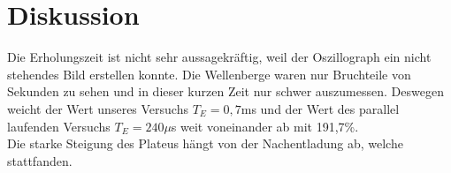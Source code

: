 \section{Diskussion}
\label{sec:Diskussion}
Die Erholungszeit ist nicht sehr aussagekräftig, weil der Oszillograph ein nicht stehendes Bild erstellen konnte.
Die Wellenberge waren nur Bruchteile von Sekunden zu sehen und in dieser kurzen Zeit nur schwer auszumessen.
Deswegen weicht der Wert unseres Versuchs $T_E=0,7$ms und der Wert des parallel laufenden Versuchs $T_E=240\mu$s weit voneinander ab mit 191,7\%. \\
Die starke Steigung des Plateus hängt von der Nachentladung ab, welche stattfanden.